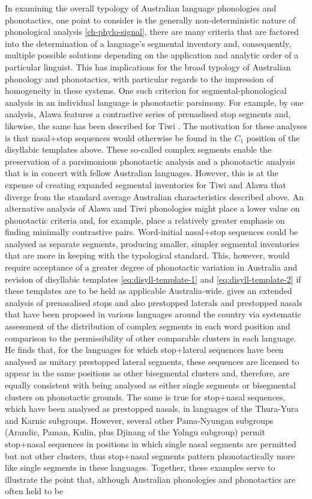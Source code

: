 In examining the overall typology of Australian language phonologies and phonotactics, one point to consider is the generally non-deterministic nature of phonological analysis \ref{ch-phylo-signal}, there are many criteria that are factored into the determination of a language's segmental inventory and, consequently, multiple possible solutions depending on the application and analytic order of a particular linguist. This has implications for the broad typology of Australian phonology and phonotactics, with particular regards to the impression of homogeneity in these systems. One such criterion for segmental-phonological analysis in an individual language is phonotactic parsimony. For example, by one analysis, Alawa features a contrastive series of prenaslised stop segments \autocite{sharpe_alawa_1972} and, likewise, the same has been described for Tiwi \autocite{lee_tiwi_1987}. The motivation for these analyses is that nasal+stop sequences would otherwise be found in the \(C_1\) position of the disyllabic templates above. These so-called complex segments enable the preservation of a parsimonious phonotactic analysis and a phonotactic analysis that is in concert with fellow Australian languages. However, this is at the expense of creating expanded segmental inventories for Tiwi and Alawa that diverge from the standard average Australian characteristics described above. An alternative analysis of Alawa and Tiwi phonologies might place a lower value on phonotactic criteria and, for example, place a relatively greater emphasis on finding minimally contrastive pairs. Word-initial nasal+stop sequences could be analysed as separate segments, producing smaller, simpler segmental inventories that are more in keeping with the typological standard. This, however, would require acceptance of a greater degree of phonotactic variation in Australia and revision of disyllabic templates \eqref{eq:disyll-template-1} and \eqref{eq:disyll-template-2} if these templates are to be held as applicable Australia-wide. \textcite{round_phonotactics_2021} gives an extended analysis of prenasalised stops and also prestopped laterals and prestopped nasals that have been proposed in various languages around the country via systematic assessment of the distribution of complex segments in each word position and comparison to the permissibility of other comparable clusters in each language. He finds that, for the languages for which stop+lateral sequences have been analysed as unitary prestopped lateral segments, these sequences are licensed to appear in the same positions as other bisegmental clusters and, therefore, are equally consistent with being analysed as either single segments or bisegmental clusters on phonotactic grounds. The same is true for stop+nasal sequences, which have been analysed as prestopped nasals, in languages of the Thura-Yura and Karnic subgroups. However, several other Pama-Nyungan subgroups (Arandic, Paman, Kulin, plus Djinang of the Yolngu subgroup) permit stop+nasal sequences in positions in which single nasal segments are permitted but not other clusters, thus stop+nasal segments pattern phonotactically more like single segments in these languages. Together, these examples serve to illustrate the point that, although Australian phonologies and phonotactics are often held to be 